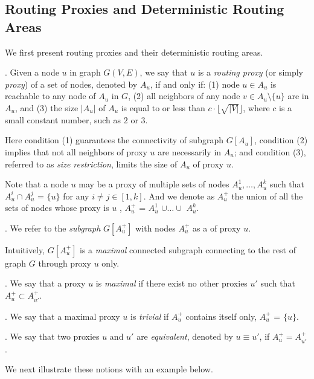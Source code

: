 \subsection{Routing Proxies and Deterministic Routing Areas}
\label{subsec-proxy-def}

We first present routing proxies and their deterministic routing areas.

. Given a node $u$ in graph $G(V, E)$, we say that $u$ is a {\em routing proxy} (or simply {\em proxy}) of a set of nodes, denoted by $A_{u}$, if and only if:
\sstab(1) node $u\in A_{u}$ is reachable to any node of $A_u$ in $G$,
\sstab(2) all neighbors of any node $v\in A_u\setminus \{u\}$ are in $A_u$,  and
\sstab(3) the size $|A_u|$ of $A_u$ is equal to or less than $c\cdot\lfloor\sqrt{|V|}\rfloor$, where $c$ is a small constant number, such as $2$ or $3$.


Here condition (1) guarantees the connectivity of subgraph $G[A_u]$,  condition (2) implies that not all neighbors of proxy $u$ are necessarily in $A_u$;
and condition (3), referred to as {\em size restriction}, limits the size of $A_u$ of proxy $u$.



Note that a node $u$ may be a proxy of multiple sets of nodes $A^1_u, \ldots, A^k_u$ such that $A^i_u\cap A^j_u$ = $\{u\}$ for any $i\ne j\in[1, k]$.
And we denote as $A^{+}_u$ the union of all the sets of nodes whose proxy is $u$ , \ie  $A^{+}_u$ = $A^1_u$ $\cup\ldots\cup$ $A^k_u$.

 . We refer to the {\em subgraph} $G[A^+_u]$ with nodes $A^+_u$ as a \dra of proxy $u$.

Intuitively, \dra $G[A^+_u]$ is a {\em maximal} connected subgraph connecting to the rest of graph $G$ through proxy $u$ only.

.  We say that a proxy $u$ is {\em maximal} if there exist no other proxies $u'$ such that $A^+_{u} \subset A^+_{u'}$.

. We say that a maximal proxy $u$ is {\em trivial} if $A^+_u$ contains itself only, \ie $A^+_{u}$ = $\{u\}$.


. We say that two proxies $u$ and $u'$ are {\em equivalent}, denoted by $u\equiv u'$, if $A^+_{u} = A^+_{u'}$.




We next illustrate these notions with an example below.

